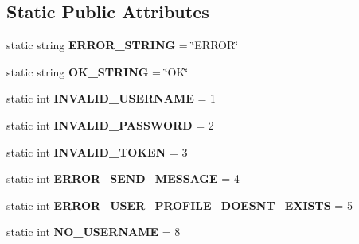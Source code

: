 \subsection*{Static Public Attributes}
\begin{DoxyCompactItemize}
\item 
\hypertarget{classServiceLayer_a958d3259dc9d8b7db628f671ac2b8c64}{static string {\bfseries E\-R\-R\-O\-R\-\_\-\-S\-T\-R\-I\-N\-G} = \char`\"{}E\-R\-R\-O\-R\char`\"{}}\label{classServiceLayer_a958d3259dc9d8b7db628f671ac2b8c64}

\item 
\hypertarget{classServiceLayer_a5109f9280872623944c8529af6992810}{static string {\bfseries O\-K\-\_\-\-S\-T\-R\-I\-N\-G} = \char`\"{}O\-K\char`\"{}}\label{classServiceLayer_a5109f9280872623944c8529af6992810}

\item 
\hypertarget{classServiceLayer_aeef05f74f4820e27835bbd7b5bba38f1}{static int {\bfseries I\-N\-V\-A\-L\-I\-D\-\_\-\-U\-S\-E\-R\-N\-A\-M\-E} = 1}\label{classServiceLayer_aeef05f74f4820e27835bbd7b5bba38f1}

\item 
\hypertarget{classServiceLayer_af48302af91d1b5f9198cc4b39ca747b2}{static int {\bfseries I\-N\-V\-A\-L\-I\-D\-\_\-\-P\-A\-S\-S\-W\-O\-R\-D} = 2}\label{classServiceLayer_af48302af91d1b5f9198cc4b39ca747b2}

\item 
\hypertarget{classServiceLayer_a2b7a685fc838d437c6da8e09bfbd3093}{static int {\bfseries I\-N\-V\-A\-L\-I\-D\-\_\-\-T\-O\-K\-E\-N} = 3}\label{classServiceLayer_a2b7a685fc838d437c6da8e09bfbd3093}

\item 
\hypertarget{classServiceLayer_a1165582032762224096a72ce3b9a026d}{static int {\bfseries E\-R\-R\-O\-R\-\_\-\-S\-E\-N\-D\-\_\-\-M\-E\-S\-S\-A\-G\-E} = 4}\label{classServiceLayer_a1165582032762224096a72ce3b9a026d}

\item 
\hypertarget{classServiceLayer_a158c78456324a5914d012a90506e2d98}{static int {\bfseries E\-R\-R\-O\-R\-\_\-\-U\-S\-E\-R\-\_\-\-P\-R\-O\-F\-I\-L\-E\-\_\-\-D\-O\-E\-S\-N\-T\-\_\-\-E\-X\-I\-S\-T\-S} = 5}\label{classServiceLayer_a158c78456324a5914d012a90506e2d98}

\item 
\hypertarget{classServiceLayer_ad6f2c41aad09560a4fe86777ffa75289}{static int {\bfseries N\-O\-\_\-\-U\-S\-E\-R\-N\-A\-M\-E} = 8}\label{classServiceLayer_ad6f2c41aad09560a4fe86777ffa75289}


\end{DoxyCompactItemize}
